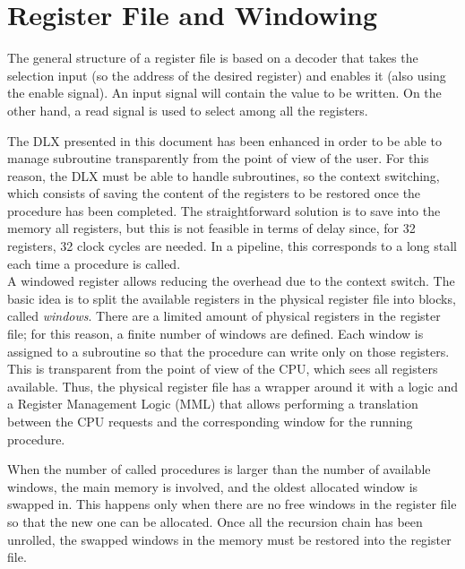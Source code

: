 \section{Register File and Windowing}
The general structure of a register file is based on a decoder that takes the selection input (so the address of the desired register) and enables it (also using the enable signal). An input signal will contain the value to be written. On the other hand, a read signal is used to select among all the registers.\newline\newline

The DLX presented in this document has been enhanced in order to be able to manage subroutine transparently from the point of view of the user. For this reason, the DLX must be able to handle subroutines, so the context switching, which consists of saving the content of the
registers to be restored once the procedure has been completed. The straightforward solution is to save into the memory all registers, but this is not feasible in terms of delay since, for 32 registers, 32 clock cycles are needed. In a pipeline, this corresponds to a long stall each time a procedure is called.\\

A windowed register allows reducing the overhead due to the context switch. The basic idea is to split the available registers in the physical register file into blocks, called \textit{windows}. There are a limited amount of physical registers in the register file; for this reason, a finite number of windows are defined. Each window is assigned to a subroutine so that the procedure can write only on those registers. This is transparent from the point of view of the CPU, which sees all registers available. Thus, the physical register file has a wrapper around it with a logic and a Register Management Logic (MML) that allows performing a translation between the CPU requests and the corresponding window for the running procedure.\newline\newline

When the number of called procedures is larger than the number of available windows, the main memory is involved, and the oldest allocated window is swapped in. This happens only when there are no free windows in the register file so that the new one can be allocated. Once all the recursion chain has been unrolled, the swapped windows in the memory must be restored into the register file.

